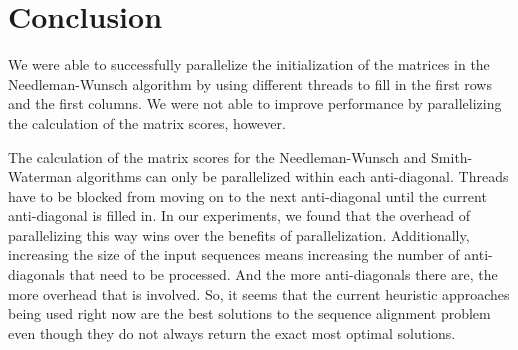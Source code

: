 \documentclass[conference]{IEEEtran}
\begin{document}
\section{Conclusion}
We were able to successfully parallelize the initialization of the matrices in the Needleman-Wunsch algorithm by using different threads to fill in the first rows and the first columns. We were not able to improve performance by parallelizing the calculation of the matrix scores, however.

The calculation of the matrix scores for the Needleman-Wunsch and Smith-Waterman algorithms can only be parallelized within each anti-diagonal. Threads have to be blocked from moving on to the next anti-diagonal until the current anti-diagonal is filled in. In our experiments, we found that the overhead of parallelizing this way wins over the benefits of parallelization. Additionally, increasing the size of the input sequences means increasing the number of anti-diagonals that need to be processed. And the more anti-diagonals there are, the more overhead that is involved. So, it seems that the current heuristic approaches being used right now are the best solutions to the sequence alignment problem even though they do not always return the exact most optimal solutions.



\end{document}
